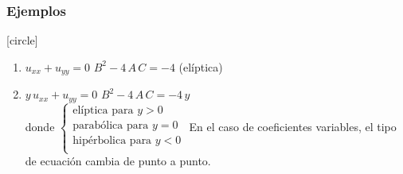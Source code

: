 \begin{frame}
\frametitle{Ejemplos}
[circle]
\begin{enumerate}[<+->]
\setlength\itemsep{1em}
\conti
\item $u_{xx} + u_{yy} = 0$ \hspace{1cm} $B^{2} - 4 \, A \, C = -4$ \hspace{0.6cm} (elíptica)
\item $y \, u_{xx} + u_{yy} = 0$ \hspace{0.6cm} $B^{2} - 4 \, A \, C = - 4 \, y$
\\
donde $\begin{cases}
\mbox{elíptica para } y > 0 \\
\mbox{parabólica para } y = 0 \\
\mbox{hipérbolica para } y < 0 \\
\end{cases}$
\newline
En el caso de coeficientes variables, el tipo de ecuación cambia de punto a punto.
\end{enumerate}
\end{frame}
